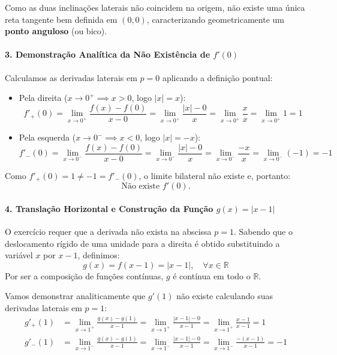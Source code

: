 \vspace{0.15cm}
\noindent
Como as duas inclinações laterais não coincidem na origem, não existe uma única reta tangente bem definida em $(0, 0)$, caracterizando geometricamente um \textbf{ponto anguloso} (ou bico).

\vspace{0.4cm}

\paragraph*{3. Demonstração Analítica da Não Existência de $f'(0)$}

\noindent
Calculamos as derivadas laterais em $p = 0$ aplicando a definição pontual:
\begin{itemize}[noitemsep, topsep=3pt]
    \item Pela direita ($x \to 0^+ \implies x > 0$, logo $|x| = x$):
    \[
    f'_+(0) = \lim_{x \to 0^+} \frac{f(x) - f(0)}{x - 0} = \lim_{x \to 0^+} \frac{|x| - 0}{x} = \lim_{x \to 0^+} \frac{x}{x} = \lim_{x \to 0^+} 1 = 1
    \]

    \item Pela esquerda ($x \to 0^- \implies x < 0$, logo $|x| = -x$):
    \[
    f'_-(0) = \lim_{x \to 0^-} \frac{f(x) - f(0)}{x - 0} = \lim_{x \to 0^-} \frac{|x| - 0}{x} = \lim_{x \to 0^-} \frac{-x}{x} = \lim_{x \to 0^-} (-1) = -1
    \]
\end{itemize}

\vspace{0.15cm}
\noindent
Como $f'_+(0) = 1 \neq -1 = f'_-(0)$, o limite bilateral não existe e, portanto:
\[
\text{Não existe } f'(0).
\]

\vspace{0.4cm}

\paragraph*{4. Translação Horizontal e Construção da Função $g(x) = |x - 1|$}

\noindent
O exercício requer que a derivada não exista na abscissa $p = 1$. Sabendo que o deslocamento rígido de uma unidade para a direita é obtido substituindo a variável $x$ por $x - 1$, definimos:
\[
g(x) = f(x - 1) = |x - 1|, \quad \forall x \in \mathbb{R}
\]
Por ser a composição de funções contínuas, $g$ é contínua em todo o $\mathbb{R}$.

\vspace{0.2cm}
\noindent
Vamos demonstrar analiticamente que $g'(1)$ não existe calculando suas derivadas laterais em $p = 1$:
\begin{align*}
g'_+(1) &= \lim_{x \to 1^+} \frac{g(x) - g(1)}{x - 1} = \lim_{x \to 1^+} \frac{|x - 1| - 0}{x - 1} = \lim_{x \to 1^+} \frac{x - 1}{x - 1} = 1 \\[0.20cm]
g'_-(1) &= \lim_{x \to 1^-} \frac{g(x) - g(1)}{x - 1} = \lim_{x \to 1^-} \frac{|x - 1| - 0}{x - 1} = \lim_{x \to 1^-} \frac{-(x - 1)}{x - 1} = -1
\end{align*}

